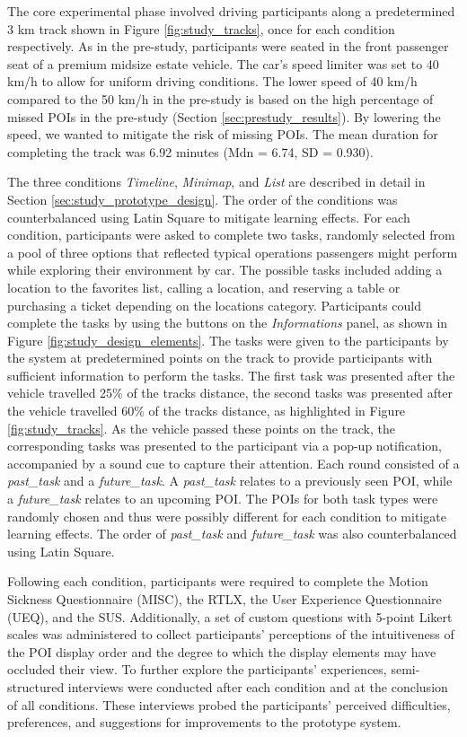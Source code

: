 The core experimental phase involved driving participants along a predetermined 3 km track shown in Figure \ref{fig:study_tracks}, once for each condition respectively. As in the pre-study, participants were seated in the front passenger seat of a premium midsize estate vehicle. The car's speed limiter was set to 40 km/h to allow for uniform driving conditions. The lower speed of 40 km/h compared to the 50 km/h in the pre-study is based on the high percentage of missed POIs in the pre-study (Section \ref{sec:prestudy_results}). By lowering the speed, we wanted to mitigate the risk of missing POIs. The mean duration for completing the track was 6.92 minutes (Mdn = 6.74, SD = 0.930).

The three conditions \textit{Timeline}, \textit{Minimap}, and \textit{List} are described in detail in Section \ref{sec:study_prototype_design}. The order of the conditions was counterbalanced using Latin Square to mitigate learning effects. For each condition, participants were asked to complete two tasks, randomly selected from a pool of three options that reflected typical operations passengers might perform while exploring their environment by car. The possible tasks included adding a location to the favorites list, calling a location, and reserving a table or purchasing a ticket depending on the locations category. Participants could complete the tasks by using the buttons on the \textit{Informations} panel, as shown in Figure \ref{fig:study_design_elements}. The tasks were given to the participants by the system at predetermined points on the track to provide participants with sufficient information to perform the tasks. The first task was presented after the vehicle travelled 25\% of the tracks distance, the second tasks was presented after the vehicle travelled 60\% of the tracks distance, as highlighted in Figure \ref{fig:study_tracks}. As the vehicle passed these points on the track, the corresponding tasks was presented to the participant via a pop-up notification, accompanied by a sound cue to capture their attention. Each round consisted of a \textit{past\_task} and a \textit{future\_task}. A \textit{past\_task} relates to a previously seen POI, while a \textit{future\_task} relates to an upcoming POI. The POIs for both task types were randomly chosen and thus were possibly different for each condition to mitigate learning effects. The order of \textit{past\_task} and \textit{future\_task} was also counterbalanced using Latin Square.

Following each condition, participants were required to complete the Motion Sickness Questionnaire (MISC), the RTLX, the User Experience Questionnaire (UEQ), and the SUS. Additionally, a set of custom questions with 5-point Likert scales was administered to collect participants' perceptions of the intuitiveness of the POI display order and the degree to which the display elements may have occluded their view. To further explore the participants' experiences, semi-structured interviews were conducted after each condition and at the conclusion of all conditions. These interviews probed the participants' perceived difficulties, preferences, and suggestions for improvements to the prototype system.

